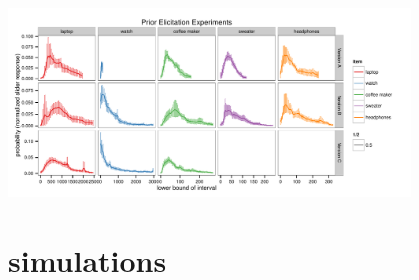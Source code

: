 \documentclass[10pt]{article}
\begin{document}
    \includegraphics[width=0.8\textwidth]{all_bins_priors.pdf}
    
%     
%     
% 
\section{simulations}
\end{document}
